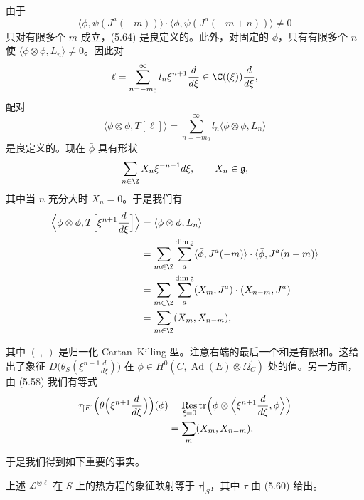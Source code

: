
由于
\[
 \langle\phi,\psi(J^a(-m))\rangle\cdot\langle\phi,\psi(J^a(-m+n))\rangle\ne0
\]
只对有限多个 $m$ 成立，(5.64) 是良定义的。此外，对固定的 $\phi$，只有有限多个 $n$ 使 $\langle\phi\otimes\phi,L_n\rangle\ne0$。因此对
\[
 \ell=\sum_{n=-m_0}^{\infty}l_n\xi^{n+1}\frac{d}{d\xi}\in\C((\xi))\frac{d}{d\xi},
\]
配对
\[
 \langle\phi\otimes\phi,T[\ell]\rangle=\sum_{n=-m_0}^{\infty}l_n\langle\phi\otimes\phi,L_n\rangle
\]
是良定义的。现在 $\bar\phi$ 具有形状
\[
 \sum_{n\in\Z}X_n\xi^{-n-1}d\xi,\qquad X_n\in\mathfrak g,
\]
其中当 $n$ 充分大时 $X_n=0$。于是我们有
\begin{align}
 \Bigl\langle\phi\otimes\phi,T\Bigl[\xi^{n+1}\frac{d}{d\xi}\Bigr]\Bigr\rangle &=\langle\phi\otimes\phi,L_n\rangle \nonumber\\
 &=\sum_{m\in\Z}\sum_a^{\dim\mathfrak g}\langle\bar\phi,J^a(-m)\rangle\cdot\langle\bar\phi,J^a(n-m)\rangle \nonumber\\
 &=\sum_{m\in\Z}\sum_a^{\dim\mathfrak g}(X_m,J^a)\cdot(X_{n-m},J^a) \nonumber\\
 &=\sum_{m\in\Z}(X_m,X_{n-m}), \nonumber
\end{align}



其中 $(\ ,\ )$ 是归一化 Cartan–Killing 型。注意右端的最后一个和是有限和。这给出了象征 $D\bigl(\theta_S(\xi^{n+1}\frac{d}{d\xi})\bigr)$ 在 $\phi\in H^0(C,\operatorname{Ad}(E)\otimes\Omega^1_C)$ 处的值。另一方面，由 (5.58) 我们有等式
\[
 \begin{aligned}
 \tau_{[E]}\Bigl(\theta\Bigl(\xi^{n+1}\frac{d}{d\xi}\Bigr)\Bigr)(\phi)
 &=\operatorname*{Res}_{\xi=0}\operatorname{tr}\Bigl(\bar\phi\otimes\Bigl\langle\xi^{n+1}\frac{d}{d\xi},\bar\phi\Bigr\rangle\Bigr)\\
 &=\sum_m(X_m,X_{n-m}).
 \end{aligned}
\]

于是我们得到如下重要的事实。

\begin{theorem}[5.31]
上述 $\mathcal L^{\otimes\ell}$ 在 $S$ 上的热方程的象征映射等于 $\tau|_S$，其中 $\tau$ 由 (5.60) 给出。
\end{theorem}

